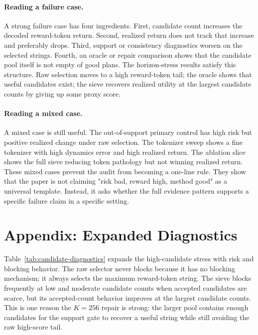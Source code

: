 \documentclass{article}
\begin{document}
\paragraph{Reading a failure case.}
A strong failure case has four ingredients. First, candidate count increases the decoded reward-token return. Second, realized return does not track that increase and preferably drops. Third, support or consistency diagnostics worsen on the selected strings. Fourth, an oracle or repair comparison shows that the candidate pool itself is not empty of good plans. The horizon-stress results satisfy this structure. Raw selection moves to a high reward-token tail; the oracle shows that useful candidates exist; the sieve recovers realized utility at the largest candidate counts by giving up some proxy score.

\paragraph{Reading a mixed case.}
A mixed case is still useful. The out-of-support primary control has high risk but positive realized change under raw selection. The tokenizer sweep shows a fine tokenizer with high dynamics error and high realized return. The ablation slice shows the full sieve reducing token pathology but not winning realized return. These mixed cases prevent the audit from becoming a one-line rule. They show that the paper is not claiming "risk bad, reward high, method good" as a universal template. Instead, it asks whether the full evidence pattern supports a specific failure claim in a specific setting.

\section{Appendix: Expanded Diagnostics}

Table~\ref{tab:candidate-diagnostics} expands the high-candidate stress with risk and blocking behavior. The raw selector never blocks because it has no blocking mechanism; it always selects the maximum reward-token string. The sieve blocks frequently at low and moderate candidate counts when accepted candidates are scarce, but its accepted-count behavior improves at the largest candidate counts. This is one reason the \(K=256\) repair is strong: the larger pool contains enough candidates for the support gate to recover a useful string while still avoiding the raw high-score tail.
\end{document}
